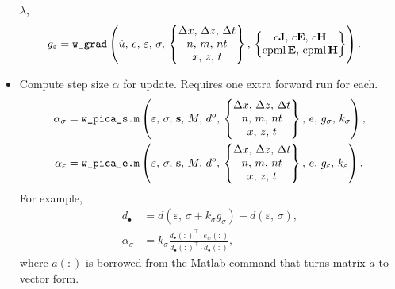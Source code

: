 \documentclass[a4paper,12pt]{article}
\begin{document}
\begin{itemize}
$\lambda$,
\begin{align*}
g_{\varepsilon}
&= 
\texttt{w\_grad}\left(
\dot{u},\, e,\,
\varepsilon,\,\sigma,\,
\left\{
\begin{matrix}
\Delta x,\, \Delta z, \, \Delta t \\
n,\, m, \, nt \\
x, \, z, \, t
\end{matrix}
\right\}, \,
\left\{
\begin{matrix}
c{\bf J},\,c{\bf E},\,c{\bf H} \\
\text{cpml}\,{\bf E},\, \text{cpml}\,{\bf H}
\end{matrix}
\right\}
\right).
\end{align*}
\item Compute step size $\alpha$ for update. Requires one extra forward run for each.
\begin{align*}
\alpha_\sigma &= \texttt{w\_pica\_s.m}
\left(
\varepsilon,\,\sigma,\, {\bf s},\, M,\, d^o,\,
\left\{
\begin{matrix}
\Delta x,\, \Delta z, \, \Delta t \\
n,\, m, \, nt \\
x, \, z, \, t
\end{matrix}
\right\},\,
e,\, g_\sigma,\, k_\sigma
\right), \\
%
\alpha_\varepsilon &= \texttt{w\_pica\_e.m}
\left(
\varepsilon,\,\sigma,\, {\bf s},\, M,\, d^o,\,
\left\{
\begin{matrix}
\Delta x,\, \Delta z, \, \Delta t \\
n,\, m, \, nt \\
x, \, z, \, t
\end{matrix}
\right\},\,
e,\, g_\varepsilon,\, k_\varepsilon
\right).
\end{align*}
%
For example, 
\begin{align*}
d_\bullet & = d(\varepsilon,\, \sigma + k_\sigma g_{\sigma})-d(\varepsilon,\,\sigma), \\
\alpha_\sigma &= 
k_\sigma
\frac{d_\bullet(:)^\top \cdot e_w(:)}{d_\bullet(:)^\top \cdot d_\bullet(:)},
\end{align*}
where $a(:)$ is borrowed from the Matlab command that turns matrix $a$ to vector form.
\end{itemize}
\newpage
\end{document}
